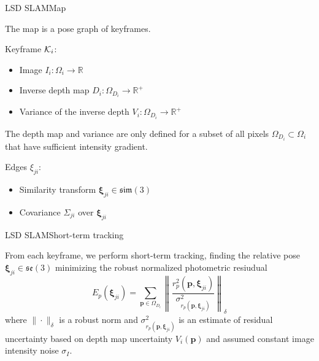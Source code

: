 \documentclass[aspectratio=169]{beamer}
\renewcommand{\vec}[1]{\boldsymbol{#1}}
\def\Rset{\mathbb{R}}
\newcommand{\lse}{\mathfrak{se}}
\newcommand{\lsim}{\mathfrak{sim}}
\newcommand{\myfig}[3]{\centerline{\texttt{[image: \#2]}}
    \centerline{\scriptsize \begin{minipage}{#1} \centering #3 \end{minipage}}}
\begin{document}
\begin{frame}{LSD SLAM}{Map}

  The map is a \alert{pose graph} of keyframes.

  \medskip

  \alert{Keyframe} ${\cal K}_i$:
  \begin{itemize}
  \item Image $I_i : \Omega_i \rightarrow \Rset$
  \item Inverse depth map $D_i : \Omega_{D_i} \rightarrow \Rset^+$
  \item Variance of the inverse depth $V_i : \Omega_{D_i} \rightarrow \Rset^+$
  \end{itemize}

  The depth map and variance are only defined for a subset of all
  pixels $\Omega_{D_i} \subset \Omega_i$ that have sufficient
  intensity gradient.

  \medskip

  \alert{Edges} $\xi_{ji}$:
  \begin{itemize}
  \item Similarity transform $\vec{\xi}_{ji} \in \lsim(3)$
  \item Covariance $\Sigma_{ji}$ over $\vec{\xi}_{ji}$
  \end{itemize}

\end{frame}




\begin{frame}{LSD SLAM}{Short-term tracking}

  From each keyframe, we perform short-term tracking, finding the
  relative pose $\vec{\xi}_{ji} \in \lse(3)$ minimizing the
  \alert{robust normalized photometric resiudual}
  $$ E_p(\vec{\xi}_{ji}) = \sum_{\vec{p}\in \Omega_{D_i}} \left\|
  \frac{r^2_p(\vec{p},\vec{\xi}_{ji})}{\sigma^2_{r_p(\vec{p},\vec{\xi}_{ji})}}
  \right\|_\delta$$ where $\|\cdot\|_\delta$ is a robust norm and
  $\sigma^2_{r_p(\vec{p},\vec{\xi}_{ji})}$ is an estimate of residual
  uncertainty based on depth map uncertainty $V_i(\vec{p})$ and
  assumed constant image intensity noise $\sigma_I$.
  
\end{frame}
\end{document}
